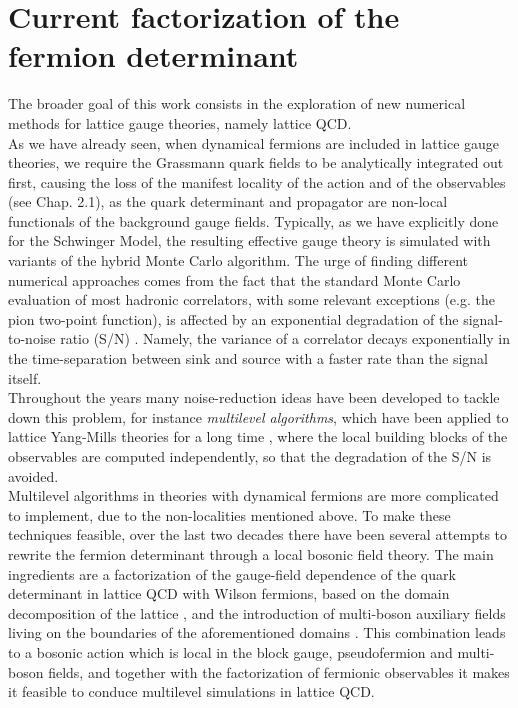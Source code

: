 \chapter{Current factorization of the fermion determinant}
\label{chap: FactStd}
The broader goal of this work consists in the exploration of new numerical methods for lattice gauge theories, namely lattice QCD.
\\ As we have already seen, when dynamical fermions are included in lattice gauge theories, we require the Grassmann quark fields to be analytically integrated out first, causing the loss of the manifest locality of the action and of the observables (see Chap. 2.1), as the quark determinant and propagator are non-local functionals of the background gauge fields. 
 Typically, as we have explicitly done for the Schwinger Model, the resulting effective gauge theory is simulated with variants of the hybrid Monte Carlo algorithm. The urge of finding different numerical approaches comes from the fact that the standard Monte Carlo evaluation of most hadronic correlators, with some relevant exceptions (e.g. the pion two-point function), is affected by an exponential degradation of the signal-to-noise ratio (S/N) \cite{PARISI1984203,Lepage:1989hd}. Namely, the variance of a correlator decays exponentially in the time-separation between sink and source with a faster rate than the signal itself.
 \\ Throughout the years many noise-reduction ideas have been developed to tackle down this problem, for instance \textit{multilevel algorithms}, which have been applied to lattice Yang-Mills theories for a long time \cite{L_scher_2001, Meyer_2003, Della_Morte_2009, Della_Morte_2011}, where the local building blocks of the observables are computed independently, so that the degradation of the S/N is avoided.
 \\ Multilevel algorithms in theories with dynamical fermions are more complicated to implement, due to the non-localities mentioned above. To make these techniques feasible, over the last two decades there have been several attempts to rewrite the fermion determinant through a local bosonic field theory. 
 The main ingredients are a factorization of the gauge-field dependence of the quark determinant in lattice QCD with Wilson fermions, based on the domain decomposition of the lattice \cite{L_scher_2004, L_scher_2005, C__2016, C__2017, Giusti_2022}, and the introduction of multi-boson auxiliary fields living on the boundaries of the aforementioned domains \cite{L_scher_1994}. This combination leads to a bosonic action which is local in the block gauge, pseudofermion and multi-boson fields, and together with the factorization of fermionic observables \cite{C__2016} it makes it feasible to conduce multilevel simulations in lattice QCD.
